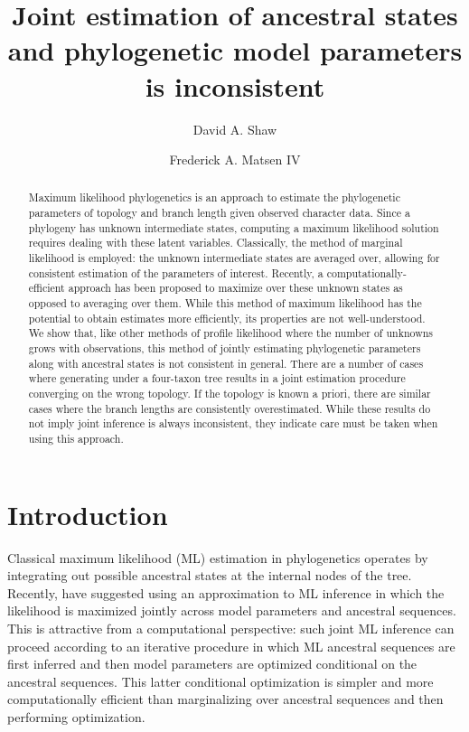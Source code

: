 \documentclass{article}
\title{Joint estimation of ancestral states and phylogenetic model parameters is inconsistent}
\author{David A. Shaw \and Frederick A. Matsen IV}
\begin{document}
\maketitle

\renewcommand{\arraystretch}{1.2} %

\begin{abstract}
Maximum likelihood phylogenetics is an approach to estimate the phylogenetic parameters of topology and branch length given observed character data.
Since a phylogeny has unknown intermediate states, computing a maximum likelihood solution requires dealing with these latent variables.
Classically, the method of marginal likelihood is employed: the unknown intermediate states are averaged over, allowing for consistent estimation of the parameters of interest.
Recently, a computationally-efficient approach has been proposed to maximize over these unknown states as opposed to averaging over them.
While this method of maximum likelihood has the potential to obtain estimates more efficiently, its properties are not well-understood.
We show that, like other methods of profile likelihood where the number of unknowns grows with observations, this method of jointly estimating phylogenetic parameters along with ancestral states is not consistent in general.
There are a number of cases where generating under a four-taxon tree results in a joint estimation procedure converging on the wrong topology.
If the topology is known a priori, there are similar cases where the branch lengths are consistently overestimated.
While these results do not imply joint inference is always inconsistent, they indicate care must be taken when using this approach.
\end{abstract}

\section*{Introduction}

Classical maximum likelihood (ML) estimation in phylogenetics operates by integrating out possible ancestral states at the internal nodes of the tree.
Recently, \cite{Sagulenko2017-jo} have suggested using an approximation to ML inference in which the likelihood is maximized jointly across model parameters and ancestral sequences.
This is attractive from a computational perspective: such joint ML inference can proceed according to an iterative procedure in which ML ancestral sequences are first inferred and then model parameters are optimized conditional on the ancestral sequences.
This latter conditional optimization is simpler and more computationally efficient than marginalizing over ancestral sequences and then performing optimization.
\end{document}
